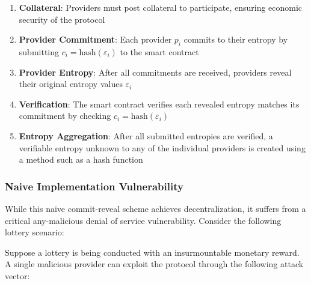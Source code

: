 \begin{enumerate}
    \item \textbf{Collateral}: Providers must post collateral to participate, ensuring economic security of the protocol
    \item \textbf{Provider Commitment}: Each provider $p_i$ commits to their entropy by submitting $c_i = \text{hash}(\varepsilon_i)$ to the smart contract
    \item \textbf{Provider Entropy}: After all commitments are received, providers reveal their original entropy values $\varepsilon_i$
    \item \textbf{Verification}: The smart contract verifies each revealed entropy matches its commitment by checking $c_i = \text{hash}(\varepsilon_i)$
    \item \textbf{Entropy Aggregation}: After all submitted entropies are verified, a verifiable entropy unknown to any of the individual providers is created using a method such as a hash function
\end{enumerate}

\subsubsection{Naive Implementation Vulnerability}\label{sec:commit_reveal_vulnerability}

While this naive commit-reveal scheme achieves decentralization, it suffers from a critical any-malicious denial of service vulnerability. Consider the following lottery scenario:

Suppose a lottery is being conducted with an insurmountable monetary reward. A single malicious provider can exploit the protocol through the following attack vector:

